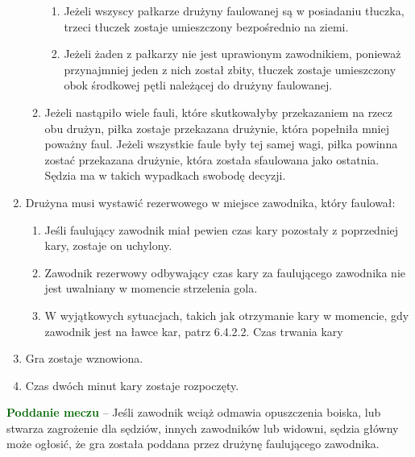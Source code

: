 \documentclass[12pt]{article}
\newcommand\other[1]{\bgroup\textcolor{darkgreen}{\textbf{#1}}}
\begin{document}
\begin{enumerate}
\begin{enumerate}
		            \begin{enumerate}
			            \item
			                  Jeżeli wszyscy pałkarze drużyny faulowanej są w posiadaniu
			                  tłuczka, trzeci tłuczek zostaje umieszczony bezpośrednio na ziemi.
			            \item
			                  Jeżeli żaden z pałkarzy nie jest uprawionym zawodnikiem, ponieważ
			                  przynajmniej jeden z nich został zbity, tłuczek zostaje
			                  umieszczony obok środkowej pętli należącej do drużyny faulowanej.
		            \end{enumerate}
		      \item
		            Jeżeli nastąpiło wiele fauli, które skutkowałyby przekazaniem na
		            rzecz obu drużyn, piłka zostaje przekazana drużynie, która popełniła
		            mniej poważny faul. Jeżeli wszystkie faule były tej samej wagi,
		            piłka powinna zostać przekazana drużynie, która została sfaulowana
		            jako ostatnia. Sędzia ma w takich wypadkach swobodę decyzji.
	      \end{enumerate}
	\item
	      Drużyna musi wystawić rezerwowego w miejsce zawodnika, który faulował:

	      \begin{enumerate}
		      \item
		            Jeśli faulujący zawodnik miał pewien czas kary pozostały z
		            poprzedniej kary, zostaje on uchylony.
		      \item
		            Zawodnik rezerwowy odbywający czas kary za faulującego zawodnika nie
		            jest uwalniany w momencie strzelenia gola.
		      \item
		            W wyjątkowych sytuacjach, takich jak otrzymanie kary w momencie, gdy
		            zawodnik jest na ławce kar, patrz 6.4.2.2. Czas trwania kary
	      \end{enumerate}
	\item
	      Gra zostaje wznowiona.
	\item
	      Czas dwóch minut kary zostaje rozpoczęty.
\end{enumerate}

\other{Poddanie meczu} -- Jeśli zawodnik wciąż odmawia opuszczenia boiska,
lub stwarza zagrożenie dla sędziów, innych zawodników lub widowni,
sędzia główny może ogłosić, że gra została poddana przez drużynę
faulującego zawodnika.
\end{document}
